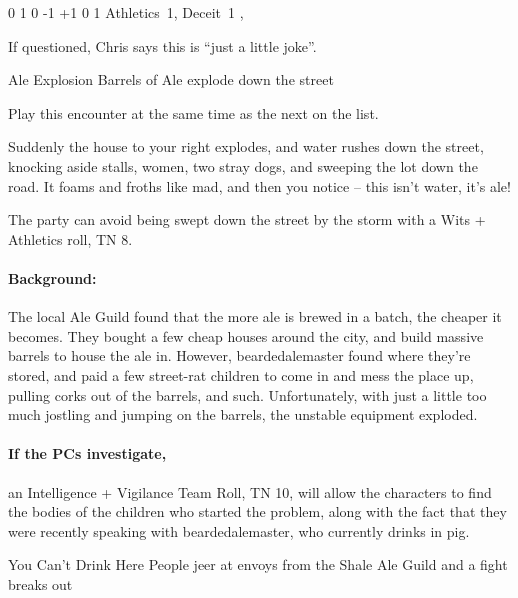 \begin{multicols}{2}
	{0}%
	{1}%
	{{0}%
	{-1}%
	{+1}}%
	{0}%
	{1}%
	{Athletics~1, Deceit~1}%
	{\longsword, \completeplate}%
	{\addtocounter{xpbonus}{-3}}

If questioned, Chris says this is ``just a little joke''.

{Ale Explosion}%
{Barrels of Ale explode down the street}%

Play this encounter at the same time as the next on the list.

\begin{boxtext}

	Suddenly the house to your right explodes, and water rushes down the street, knocking aside stalls, women, two stray dogs, and sweeping the lot down the road.  It foams and froths like mad, and then you notice -- this isn't water, it's ale!

\end{boxtext}

The party can avoid being swept down the street by the storm with a Wits + Athletics roll, TN 8.

\paragraph{Background:} The local Ale Guild found that the more ale is brewed in a batch, the cheaper it becomes.
They bought a few cheap houses around the city, and build massive barrels to house the ale in.
However, \gls{beardedalemaster} found where they're stored, and paid a few street-rat children to come in and mess the place up, pulling corks out of the barrels, and such.
Unfortunately, with just a little too much jostling and jumping on the barrels, the unstable equipment exploded.

\paragraph{If the PCs investigate,}
an Intelligence + Vigilance Team Roll, TN 10, will allow the characters to find the bodies of the children who started the problem, along with the fact that they were recently speaking with \gls{beardedalemaster}, who currently drinks in \gls{pig}.%
\iftoggle{core}%
{\footnote{See the core rules, page \pageref{teamwork}, for Team Rolls.}}%
{}%

{You Can't Drink Here}%
{People jeer at envoys from the Shale Ale Guild and a fight breaks out}%


\end{multicols}
